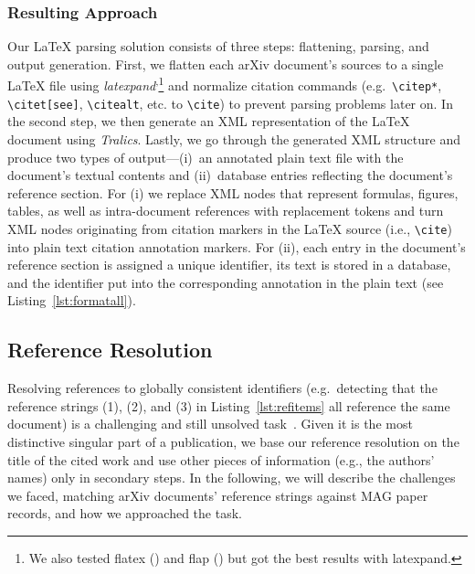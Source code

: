 \subsubsection{Resulting Approach}
Our \LaTeX{} parsing solution consists of three steps: flattening, parsing, and output generation. First, we flatten each arXiv document's sources to a single \LaTeX{} file using \textit{latexpand}\textsuperscript{,}\footnote{We also tested flatex () and flap () but got the best results with latexpand.} and normalize citation commands (e.g.\ \texttt{\textbackslash citep*}, \texttt{\textbackslash citet[see]}, \texttt{\textbackslash citealt}, etc. to \texttt{\textbackslash cite}) to prevent parsing problems later on. In the second step, we then generate an XML representation of the \LaTeX{} document using \textit{Tralics}. Lastly, we go through the generated XML structure and produce two types of output---(i)~an annotated plain text file with the document's textual contents and (ii)~database entries reflecting the document's reference section. For (i) we replace XML nodes that represent formulas, figures, tables, as well as intra-document references with replacement tokens and turn XML nodes originating from citation markers in the \LaTeX{} source (i.e., \texttt{\textbackslash cite}) into plain text citation annotation markers. For (ii), each entry in the document's reference section is assigned a unique identifier, its text is stored in a database, and the identifier put into the corresponding annotation in the plain text (see Listing~\ref{lst:formatall}).

\subsection{Reference Resolution}
\label{sec:refresol}
Resolving references to globally consistent identifiers (e.g.\ detecting that the reference strings (1), (2), and (3) in Listing~\ref{lst:refitems} all reference the same document) is a challenging and still unsolved task~\cite{Nasar2018}. Given it is the most distinctive singular part of a publication, we base our reference resolution on the title of the cited work and use other pieces of information (e.g., the authors' names) only in secondary steps. In the following, we will describe the challenges we faced, matching arXiv documents' reference strings against MAG paper records, and how we approached the task.

